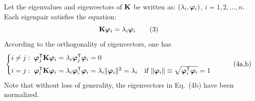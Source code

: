 Let the eigenvalues and eigenvectors of $\mathbf{K}$ be written as: $(\lambda_i,\bm{\varphi}_i)$, $i = 1,2,\dots,n$. Each eigenpair satisfies the equation:
\begin{equation}
  \mathbf{K}\bm{\varphi}_i = \lambda_i\bm{\varphi}_i \tag{3}
\end{equation}
According to the orthogonality of eigenvectors, one has
\begin{equation}
  \begin{cases}
    i\neq j:\; \bm{\varphi}_j^{\mathsf{T}}\mathbf{K}\bm{\varphi}_i = \lambda_i\bm{\varphi}_j^{\mathsf{T}}\bm{\varphi}_i = 0\\[4pt]
    i = j:\; \bm{\varphi}_i^{\mathsf{T}}\mathbf{K}\bm{\varphi}_i = \lambda_i\bm{\varphi}_i^{\mathsf{T}}\bm{\varphi}_i = \lambda_i\|\bm{\varphi}_i\|^2 = \lambda_i\quad\text{if }\|\bm{\varphi}_i\|\equiv\sqrt{\bm{\varphi}_i^{\mathsf{T}}\bm{\varphi}_i} = 1
  \end{cases} \tag{4a,b}
\end{equation}
Note that without loss of generality, the eigenvectors in Eq.~(4b) have been normalized.

